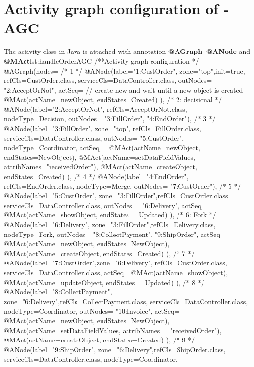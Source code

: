 %
\section{Activity graph configuration of \orderman - AGC} \label{apex:agl-agc}
%
\begin{lstcodeplainssm}{The activity class  in Java is attached with annotation \textbf{@AGraph}, \textbf{@ANode} and \textbf{@MAct}}{lst:handleOrderAGC}
/**Activity graph configuration */
@AGraph(nodes={
	/* 1 */    
	@ANode(label="1:CustOrder", zone="top",init=true, 
	refCls=CustOrder.class, serviceCls=DataController.class, 
	outNodes= {"2:AcceptOrNot"},
	actSeq={
		// create new and wait until a new object is created
		@MAct(actName=newObject, endStates={Created})
	}),
	/* 2: decisional */    
	@ANode(label="2:AcceptOrNot", 
	refCls=AcceptOrNot.class, nodeType=Decision, 
	outNodes= {"3:FillOrder", "4:EndOrder"}),
	/* 3 */    
	@ANode(label="3:FillOrder", zone="top", refCls=FillOrder.class, serviceCls=DataController.class,
	outNodes= {"5:CustOrder"},
	nodeType=Coordinator,
	actSeq = {
		@MAct(actName=newObject, endStates={NewObject}),
		@MAct(actName=setDataFieldValues, attribNames={"receivedOrder"}),
		@MAct(actName=createObject, endStates={Created})
	}),
	/* 4 */    
	@ANode(label="4:EndOrder", refCls=EndOrder.class, 
	nodeType=Merge, outNodes= {"7:CustOrder"}),
	/* 5 */    
	@ANode(label="5:CustOrder", zone="3:FillOrder",refCls=CustOrder.class, serviceCls=DataController.class,
	outNodes = {"6:Delivery"},
	actSeq = {
		@MAct(actName=showObject, endStates = {Updated})
	}),
	/* 6: Fork */    
	@ANode(label="6:Delivery", zone="3:FillOrder",refCls=Delivery.class, 
	nodeType=Fork, outNodes= {"8:CollectPayment", "9:ShipOrder"},
	actSeq = {
		@MAct(actName=newObject, endStates={NewObject}),
		@MAct(actName=createObject, endStates={Created})      
	}
	),
	/* 7 */    
	@ANode(label="7:CustOrder",zone="6:Delivery", refCls=CustOrder.class, serviceCls=DataController.class, 
	actSeq={
		@MAct(actName=showObject),
		@MAct(actName=updateObject, endStates = {Updated})
	}),
	/* 8 */    
	@ANode(label="8:CollectPayment", zone="6:Delivery",refCls=CollectPayment.class, 
	serviceCls=DataController.class,
	nodeType=Coordinator,
	outNodes= {"10:Invoice"},
	actSeq={
		@MAct(actName=newObject, endStates={NewObject}),
		@MAct(actName=setDataFieldValues, attribNames = {"receivedOrder"}),
		@MAct(actName=createObject, endStates={Created})
	}),
	/* 9 */    
	@ANode(label="9:ShipOrder", zone="6:Delivery",refCls=ShipOrder.class, serviceCls=DataController.class,
	nodeType=Coordinator,
}
\end{lstcodeplainssm}
